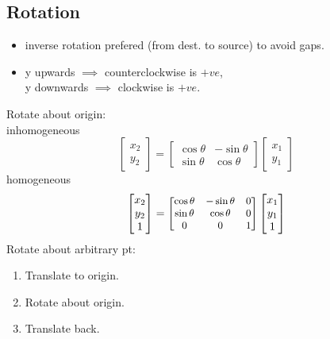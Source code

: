 \subsection{Rotation}
\begin{itemize}
  \item inverse rotation prefered (from dest. to source) to avoid gaps.
  \item y upwards $\implies$ counterclockwise is $+ve$, \\
  y downwards $\implies$ clockwise is $+ve$.
\end{itemize}
Rotate about origin:\\
inhomogeneous
\[\begin{bmatrix}
  x_2\\
  y_2
\end{bmatrix} =
\begin{bmatrix}
  \cos{\theta} & -\sin{\theta}\\
  \sin{\theta} & \cos{\theta}
\end{bmatrix}
\begin{bmatrix}
  x_1\\
  y_1
\end{bmatrix}\]
homogeneous
\[\begin{bmatrix}
  x_2\\
  y_2\\
  1
\end{bmatrix}=
{\small
\begin{bmatrix}
  \cos{\theta}  & -\sin{\theta}  & 0\\
  \sin{\theta}  & \cos{\theta}   & 0\\
  0 & 0 & 1
\end{bmatrix}}
\begin{bmatrix}
  x_1\\
  y_1\\
  1
\end{bmatrix}\]
Rotate about arbitrary pt:
\begin{enumerate}
  \item Translate to origin.
  \item Rotate about origin.
  \item Translate back.
\end{enumerate}
